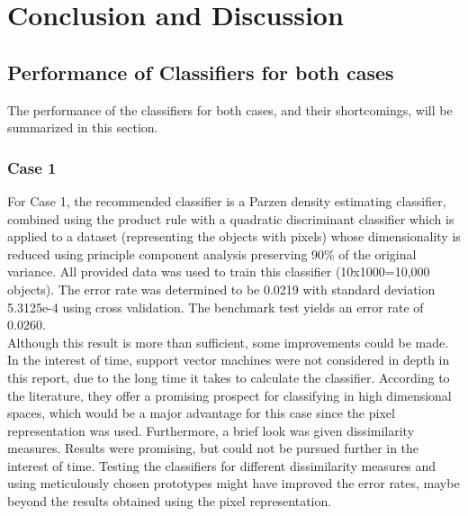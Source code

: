 \section{Conclusion and Discussion}
\label{sec:DiscConcl}
\subsection{Performance of Classifiers for both cases}
The performance of the classifiers for both cases, and their shortcomings, will be summarized in this section. \\
\subsubsection*{Case 1}
For Case 1, the recommended classifier is a Parzen density estimating classifier, combined using the product rule with a quadratic discriminant classifier which is applied to a dataset (representing the objects with pixels) whose dimensionality is reduced using principle component analysis preserving 90\% of the original variance. All provided data was used to train this classifier (10x1000=10,000 objects). The error rate was determined to be 0.0219 with standard deviation 5.3125e-4 using cross validation. The benchmark test yields an error rate of 0.0260.\\
Although this result is more than sufficient, some improvements could be made. In the interest of time, support vector machines were not considered in depth in this report, due to the long time it takes to calculate the classifier. According to the literature, they offer a promising prospect for classifying in high dimensional spaces, which would be a major advantage for this case since the pixel representation was used.
Furthermore, a brief look was given dissimilarity measures. Results were promising, but could not be pursued further in the interest of time. Testing the classifiers for different dissimilarity measures and using meticulously chosen prototypes might have improved the error rates, maybe beyond the results obtained using the pixel representation. \\

